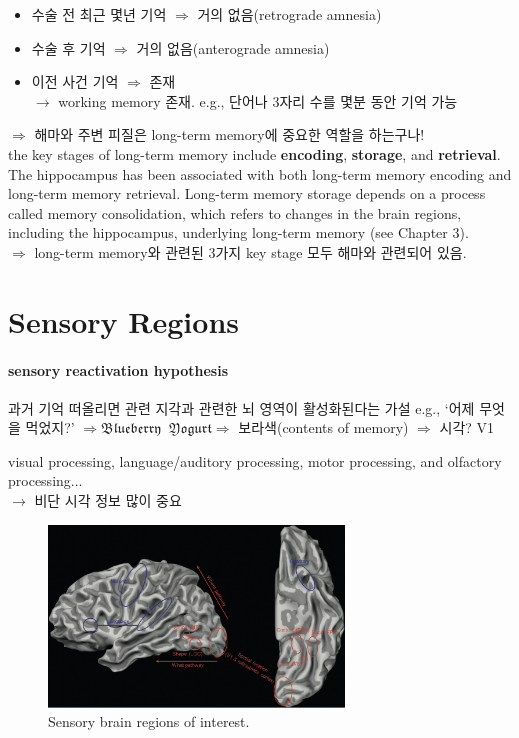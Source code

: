 \documentclass[../note.tex]{subfiles}
\begin{document}
\begin{itemize}
  \item 수술 전 최근 몇년 기억 $\Rightarrow$ 거의 없음(retrograde amnesia)
  \item 수술 후 기억 $\Rightarrow$ 거의 없음(anterograde amnesia)
  \item 이전 사건 기억 $\Rightarrow$ 존재\\
    $\longrightarrow$ working memory 존재. e.g., 단어나 3자리 수를 몇분 동안 기억 가능
\end{itemize}

$\Longrightarrow$ 해마와 주변 피질은 long-term memory에 중요한 역할을 하는구나!\\

the key stages of long-term memory include \textbf{encoding}, \textbf{storage}, and \textbf{retrieval}.
The hippocampus has been associated with both long-term memory encoding and long-term memory retrieval.
Long-term memory storage depends on a process called
memory consolidation, which refers to changes in the brain regions,
including the hippocampus, underlying long-term memory (see
Chapter 3).\\
$\Longrightarrow$ long-term memory와 관련된 3가지 key stage 모두 해마와 관련되어 있음.

\section{Sensory Regions}
\paragraph{sensory reactivation hypothesis}
과거 기억 떠올리면 관련 지각과 관련한 뇌 영역이 활성화된다는 가설
e.g., `어제 무엇을 먹었지?' $\Rightarrow \mathfrak{Blueberry}\;\;\mathfrak{Yogurt} \Rightarrow$ 보라색(contents of memory) $\Rightarrow$ 시각? V1

visual processing, language/auditory processing, motor processing, and olfactory processing...\\
$\rightarrow$ 비단 시각 정보 많이 중요

\begin{figure}[h]
  \centering
  \includegraphics[width=0.7\textwidth]{image/sensory_regions}
  \caption{Sensory brain regions of interest.}
  \label{fig:sensory_regions}
\end{figure}
\end{document}
